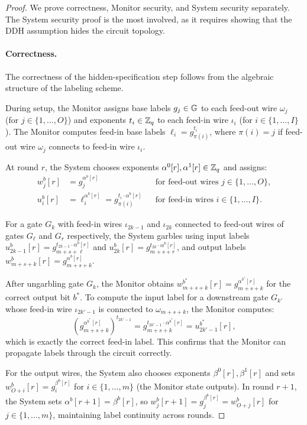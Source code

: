 \Protocoltwosecure*

\begin{proof}
We prove correctness, Monitor security, and System security separately. The System security proof is the most involved, as it requires showing that the DDH assumption hides the circuit topology.

\paragraph{Correctness.}
The correctness of the hidden-specification step follows from the algebraic structure of the labeling scheme.

During setup, the Monitor assigns base labels $g_j \in \mathbb{G}$ to each feed-out wire $\omega_j$ (for $j \in \{1, \ldots, O\}$) and exponents $t_i \in \mathbb{Z}_q$ to each feed-in wire $\iota_i$ (for $i \in \{1, \ldots, I\}$). The Monitor computes feed-in base labels $\ell_i = g_{\pi(i)}^{t_i}$, where $\pi(i) = j$ if feed-out wire $\omega_j$ connects to feed-in wire $\iota_i$.

At round $r$, the System chooses exponents $\alpha^0[r], \alpha^1[r] \in \mathbb{Z}_q$ and assigns:
\begin{align*}
    w_j^b[r] &= g_j^{\alpha^b[r]} && \text{for feed-out wires } j \in \{1, \ldots, O\}, \\
    u_i^b[r] &= \ell_i^{\alpha^b[r]} = g_{\pi(i)}^{t_i \cdot \alpha^b[r]} && \text{for feed-in wires } i \in \{1, \ldots, I\}.
\end{align*}

For a gate $G_k$ with feed-in wires $\iota_{2k-1}$ and $\iota_{2k}$ connected to feed-out wires of gates $G_\ell$ and $G_r$ respectively, the System garbles using input labels $u_{2k-1}^b[r] = g_{m+s+\ell}^{t_{2k-1} \cdot \alpha^b[r]}$ and $u_{2k}^b[r] = g_{m+s+r}^{t_{2k} \cdot \alpha^b[r]}$, and output labels $w_{m+s+k}^b[r] = g_{m+s+k}^{\alpha^b[r]}$.

After ungarbling gate $G_k$, the Monitor obtains $w_{m+s+k}^{b^*}[r] = g_{m+s+k}^{\alpha^{b^*}[r]}$ for the correct output bit $b^*$. To compute the input label for a downstream gate $G_{k'}$ whose feed-in wire $\iota_{2k'-1}$ is connected to $\omega_{m+s+k}$, the Monitor computes:
\[
\left(g_{m+s+k}^{\alpha^{b^*}[r]}\right)^{t_{2k'-1}} = g_{m+s+k}^{t_{2k'-1} \cdot \alpha^{b^*}[r]} = u_{2k'-1}^{b^*}[r],
\]
which is exactly the correct feed-in label. This confirms that the Monitor can propagate labels through the circuit correctly.

For the output wires, the System also chooses exponents $\beta^0[r], \beta^1[r]$ and sets $w_{O+i}^b[r] = g_i^{\beta^b[r]}$ for $i \in \{1, \ldots, m\}$ (the Monitor state outputs). In round $r+1$, the System sets $\alpha^b[r+1] = \beta^b[r]$, so $w_j^b[r+1] = g_j^{\beta^b[r]} = w_{O+j}^b[r]$ for $j \in \{1, \ldots, m\}$, maintaining label continuity across rounds.


\end{proof}
